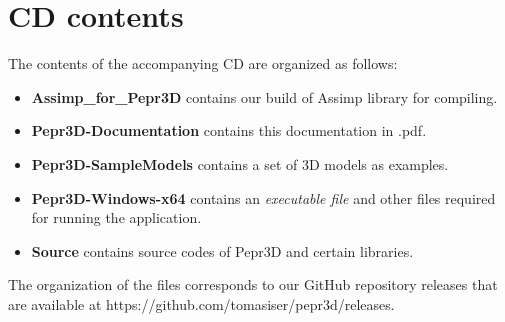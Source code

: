 \chapter{CD contents}

The contents of the accompanying CD are organized as follows:

\begin{itemize}
\item \textbf{Assimp\_for\_Pepr3D} contains our build of Assimp library for compiling.
\item \textbf{Pepr3D-Documentation} contains this documentation in .pdf.
\item \textbf{Pepr3D-SampleModels} contains a set of 3D models as examples.
\item \textbf{Pepr3D-Windows-x64} contains an \emph{executable file} and other files required for running the application.
\item \textbf{Source} contains source codes of Pepr3D and certain libraries.
\end{itemize}

The organization of the files corresponds to our GitHub repository releases that are available at https://github.com/tomasiser/pepr3d/releases.